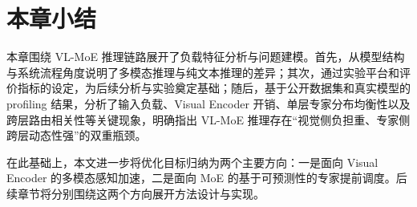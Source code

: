 \section{本章小结}
本章围绕 VL-MoE 推理链路展开了负载特征分析与问题建模。首先，从模型结构与系统流程角度说明了多模态推理与纯文本推理的差异；其次，通过实验平台和评价指标的设定，为后续分析与实验奠定基础；随后，基于公开数据集和真实模型的 profiling 结果，分析了输入负载、Visual Encoder 开销、单层专家分布均衡性以及跨层路由相关性等关键现象，明确指出 VL-MoE 推理存在“视觉侧负担重、专家侧跨层动态性强”的双重瓶颈。

在此基础上，本文进一步将优化目标归纳为两个主要方向：一是面向 Visual Encoder 的多模态感知加速，二是面向 MoE 的基于可预测性的专家提前调度。后续章节将分别围绕这两个方向展开方法设计与实现。
